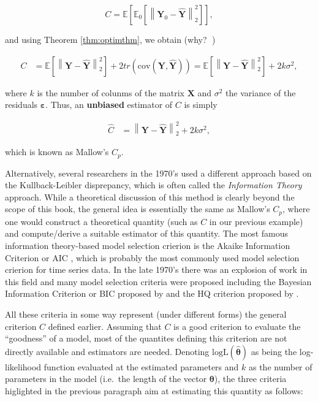 \documentclass[]{book}
\theoremstyle{definition}
\theoremstyle{definition}
\theoremstyle{definition}
\theoremstyle{remark}
\begin{document}
\begin{equation*}
C = \mathbb{E}\left[ \mathbb{E}_0 \left[ \left\| \mathbf{Y}_0 - \hat{\mathbf{Y}} \right\|_2^2 \right] \right],
\end{equation*}

and using Theorem \ref{thm:optimthm}, we obtain (why? 🤔)

\begin{align*}
C &= \mathbb{E}\left[  \left\| \mathbf{Y} - \hat{\mathbf{Y}} \right\|_2^2 \right] + 2tr \left( \text{cov} \left( \mathbf{Y}, \hat{\mathbf{Y}} \right) \right) = \mathbb{E}\left[  \left\| \mathbf{Y} - \hat{\mathbf{Y}} \right\|_2^2 \right] + 2k \sigma^2,
\end{align*}

where \(k\) is the number of colunms of the matrix \(\mathbf{X}\) and
\(\sigma^2\) the variance of the residuals \(\boldsymbol{\varepsilon}\).
Thus, an \textbf{unbiased} estimator of \(C\) is simply

\begin{align*}
\hat{C} &=  \left\| \mathbf{Y} - \hat{\mathbf{Y}} \right\|_2^2 + 2k \sigma^2,
\end{align*}

which is known as Mallow's \(C_p\).

Alternatively, several researchers in the 1970's used a different
approach based on the Kullback-Leibler disprepancy, which is often
called the \emph{Information Theory} approach. While a theoretical
discussion of this method is clearly beyond the scope of this book, the
general idea is essentially the same as Mallow's \(C_p\), where one
would construct a theoretical quantity (such as \(C\) in our previous
example) and compute/derive a suitable estimator of this quantity. The
most famous information theory-based model selection crierion is the
Akaike Information Criterion or AIC \citep[see][]{akaike1974new}, which
is probably the most commonly used model selection crierion for time
series data. In the late 1970's there was an explosion of work in this
field and many model selection criteria were proposed including the
Bayesian Information Criterion or BIC proposed by
\citet{schwarz1978estimating} and the HQ criterion proposed by
\citet{hannan1979determination}.

All these criteria in some way represent (under different forms) the
general criterion \(C\) defined earlier. Assuming that \(C\) is a good
criterion to evaluate the ``goodness'' of a model, most of the quantites
defining this criterion are not directly available and estimators are
needed. Denoting \(\text{logL}(\hat{\boldsymbol{\theta}})\) as being the
log-likelihood function evaluated at the estimated parameters and \(k\)
as the number of parameters in the model (i.e.~the length of the vector
\(\boldsymbol{\theta}\)), the three criteria higlighted in the previous
paragraph aim at estimating this quantity as follows:
\end{document}
